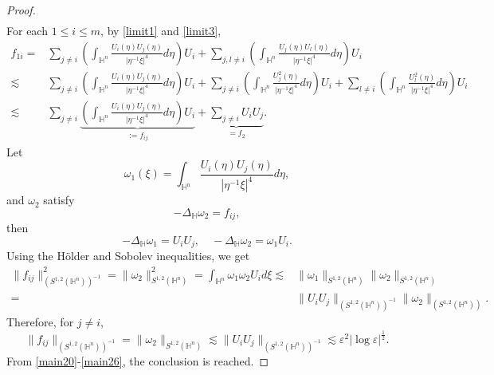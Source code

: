 \documentclass[11pt]{article}
\begin{document}
\begin{proof}
\begin{align}
\end{align}
For each $1\leq i\leq m$, by \eqref{limit1} and \eqref{limit3},
\begin{align}\label{main25}
  f_{1i}=&\sum\limits_{j\neq i}\left(\int_{\mathbb{H}^{n}}\frac{U_i (\eta) U_j(\eta)}{|\eta^{-1}\xi|^{4}}{d}\eta\right)U_i+\sum\limits_{j,l\neq i}\left(\int_{\mathbb{H}^{n}}\frac{U_j(\eta) U_l(\eta)}{|\eta^{-1}\xi|^{4}}{d}\eta\right)U_i \nonumber\\
  \lesssim &\sum\limits_{j\neq i}\left(\int_{\mathbb{H}^{n}}\frac{U_i (\eta) U_j(\eta)}{|\eta^{-1}\xi|^{4}}{d}\eta\right)U_i+\sum\limits_{j\neq i}\left(\int_{\mathbb{H}^{n}}\frac{U_j^2(\eta)}{|\eta^{-1}\xi|^{4}}{d}\eta\right)U_i+\sum\limits_{l\neq i}\left(\int_{\mathbb{H}^{n}}\frac{U_l^2(\eta)}{|\eta^{-1}\xi|^{4}}{d}\eta\right)U_i \nonumber\\
   \lesssim&\sum\limits_{j\neq i}\underbrace{\left(\int_{\mathbb{H}^{n}}\frac{U_i(\eta) U_j(\eta)}{|\eta^{-1}\xi|^{4}}{d}\eta\right)U_i}_{:=f_{ij}}+\underbrace{\sum\limits_{j\neq i}U_iU_j}_{=f_2}.
\end{align}
Let
\begin{equation*}
  \omega_1(\xi)=\int_{\mathbb{H}^{n}}\frac{U_i(\eta) U_j(\eta)}{|\eta^{-1}\xi|^{4}}{d}\eta,
\end{equation*}
and $\omega_2$ satisfy
\begin{equation*}
 -\Delta_{\mathbb{H}} \omega_2=f_{ij},
\end{equation*}
then
\begin{equation*}
  -\Delta_{\mathbb{H}}\omega_1=U_i U_j,\quad -\Delta_{\mathbb{H}}\omega_2=\omega_1U_i.
\end{equation*}
Using the H\"{o}lder and Sobolev inequalities, we get
\begin{align*}
  \|f_{ij}\|^2_{(S^{1,2}(\mathbb{H}^{n}))^{-1}}=\|\omega_2\|^2_{S^{1,2}(\mathbb{H}^{n})}=
  \int_{\mathbb{H}^{n}}\omega_1\omega_2U_id\xi\lesssim & \|\omega_1\|_{S^{1,2}(\mathbb{H}^{n})}\|\omega_2\|_{S^{1,2}(\mathbb{H}^{n})}\\
  =& \|U_i U_j\|_{(S^{1,2}(\mathbb{H}^{n}))^{-1}}\|\omega_2\|_{(S^{1,2}(\mathbb{H}^{n}))}.
\end{align*}
Therefore, for $j\neq i$,
\begin{equation}\label{main26}
  \|f_{ij}\|_{(S^{1,2}(\mathbb{H}^{n}))^{-1}}=\|\omega_2\|_{S^{1,2}(\mathbb{H}^{n})}\lesssim \|U_i U_j\|_{(S^{1,2}(\mathbb{H}^{n}))^{-1}}\lesssim \varepsilon^2|\log \varepsilon|^{\frac{1}{2}}.
\end{equation}
From \eqref{main20}-\eqref{main26}, the conclusion is reached.
\end{proof}
\end{document}
